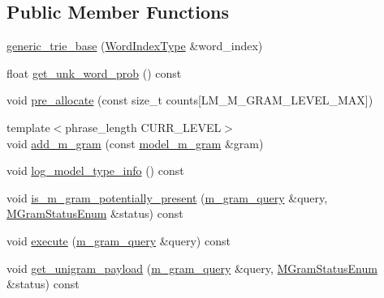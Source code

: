\subsection*{Public Member Functions}
\begin{DoxyCompactItemize}
\item 
\hyperlink{classuva_1_1smt_1_1bpbd_1_1server_1_1lm_1_1generic__trie__base_ac63c346d3aa5cbcc5268faeeafe0fba0}{generic\+\_\+trie\+\_\+base} (\hyperlink{classuva_1_1smt_1_1bpbd_1_1server_1_1lm_1_1word__index__trie__base_a64279b5b94c421b25aedaa72e73d013c}{Word\+Index\+Type} \&word\+\_\+index)
\item 
float \hyperlink{classuva_1_1smt_1_1bpbd_1_1server_1_1lm_1_1generic__trie__base_a1bc9eaa24ea40f2c777f9fc3959eca05}{get\+\_\+unk\+\_\+word\+\_\+prob} () const 
\item 
void \hyperlink{classuva_1_1smt_1_1bpbd_1_1server_1_1lm_1_1generic__trie__base_acd30b95a28c0df80354b105526e71c29}{pre\+\_\+allocate} (const size\+\_\+t counts\mbox{[}L\+M\+\_\+\+M\+\_\+\+G\+R\+A\+M\+\_\+\+L\+E\+V\+E\+L\+\_\+\+M\+A\+X\mbox{]})
\item 
{\footnotesize template$<$phrase\+\_\+length C\+U\+R\+R\+\_\+\+L\+E\+V\+E\+L$>$ }\\void \hyperlink{classuva_1_1smt_1_1bpbd_1_1server_1_1lm_1_1generic__trie__base_ad8849c7d2e5001663e3d43748dc54360}{add\+\_\+m\+\_\+gram} (const \hyperlink{classuva_1_1smt_1_1bpbd_1_1server_1_1lm_1_1m__grams_1_1model__m__gram}{model\+\_\+m\+\_\+gram} \&gram)
\item 
void \hyperlink{classuva_1_1smt_1_1bpbd_1_1server_1_1lm_1_1generic__trie__base_a8ad8404f4c03339ed2a22247271dff0e}{log\+\_\+model\+\_\+type\+\_\+info} () const 
\item 
void \hyperlink{classuva_1_1smt_1_1bpbd_1_1server_1_1lm_1_1generic__trie__base_a698bd222f7064a0149c94ceca7bd2ab4}{is\+\_\+m\+\_\+gram\+\_\+potentially\+\_\+present} (\hyperlink{classuva_1_1smt_1_1bpbd_1_1server_1_1lm_1_1m__gram__query}{m\+\_\+gram\+\_\+query} \&query, \hyperlink{namespaceuva_1_1smt_1_1bpbd_1_1server_1_1lm_ab9b3e7382b561dcb8abcd6b55e9b796a}{M\+Gram\+Status\+Enum} \&status) const 
\item 
void \hyperlink{classuva_1_1smt_1_1bpbd_1_1server_1_1lm_1_1generic__trie__base_abe0f1395bfe1c4d3b3cf33ca6071daa6}{execute} (\hyperlink{classuva_1_1smt_1_1bpbd_1_1server_1_1lm_1_1m__gram__query}{m\+\_\+gram\+\_\+query} \&query) const 
\item 
void \hyperlink{classuva_1_1smt_1_1bpbd_1_1server_1_1lm_1_1generic__trie__base_a73bfcff75e55219762cfe13e98cd940e}{get\+\_\+unigram\+\_\+payload} (\hyperlink{classuva_1_1smt_1_1bpbd_1_1server_1_1lm_1_1m__gram__query}{m\+\_\+gram\+\_\+query} \&query, \hyperlink{namespaceuva_1_1smt_1_1bpbd_1_1server_1_1lm_ab9b3e7382b561dcb8abcd6b55e9b796a}{M\+Gram\+Status\+Enum} \&status) const 

\end{DoxyCompactItemize}
